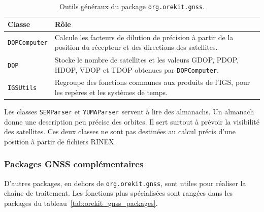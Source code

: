 \begin{table}[htbp]
\centering
\small
\begin{tabularx}{\textwidth}{|>{\raggedright\arraybackslash}p{}|
                                  >{\raggedright\arraybackslash}X|}
\hline
\textbf{Classe} & \textbf{Rôle} \\
\hline
\texttt{DOPComputer} & Calcule les facteurs de dilution de précision à partir
de la position du récepteur et des directions des satellites. \\
\hline
\texttt{DOP} & Stocke le nombre de satellites et les valeurs GDOP, PDOP, HDOP,
VDOP et TDOP obtenues par \texttt{DOPComputer}. \\
\hline
\texttt{IGSUtils} & Regroupe des fonctions communes aux produits de l'IGS,
pour les repères et les systèmes de temps. \\
\hline
\end{tabularx}
\caption{Outils généraux du package \texttt{org.orekit.gnss}.}
\label{tab:orekit_gnss_tools}
\end{table}

Les classes \texttt{SEMParser} et \texttt{YUMAParser} servent à lire des
almanachs. Un almanach donne une description peu précise des orbites. Il sert
surtout à prévoir la visibilité des satellites. Ces deux classes ne sont pas
destinées au calcul précis d'une position à partir de fichiers RINEX.

\subsubsection{Packages GNSS complémentaires}

D'autres packages, en dehors de \texttt{org.orekit.gnss}, sont utiles pour réaliser la chaîne de
traitement. Les fonctions plus spécialisées sont rangées dans les packages
du tableau~\ref{tab:orekit_gnss_packages}.

